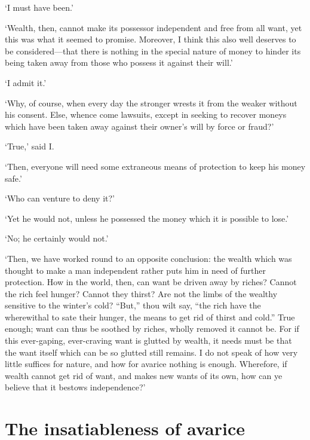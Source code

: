 \documentclass[11pt]{book}
\begin{document}
`I must have been.'

`Wealth, then, cannot make its possessor independent and free from all
want, yet this was what it seemed to promise. Moreover, I think this
also well deserves to be considered---that there is nothing in the
special nature of money to hinder its being taken away from those who
possess it against their will.'

`I admit it.'

`Why, of course, when every day the stronger wrests it from the weaker
without his consent. Else, whence come lawsuits, except in seeking to
recover moneys which have been taken away against their owner's will by
force or fraud?'

`True,' said I.

`Then, everyone will need some extraneous means of protection to keep
his money safe.'

`Who can venture to deny it?'

`Yet he would not, unless he possessed the money which it is possible to
lose.'

`No; he certainly would not.'

`Then, we have worked round to an opposite conclusion: the wealth which
was thought to make a man independent rather puts him in need of further
protection. How in the world, then, can want be driven away by riches?
Cannot the rich feel hunger? Cannot they thirst? Are not the limbs of
the wealthy sensitive to the winter's cold? ``But,'' thou wilt say, ``the
rich have the wherewithal to sate their hunger, the means to get rid of
thirst and cold.'' True enough; want can thus be soothed by riches,
wholly removed it cannot be. For if this ever-gaping, ever-craving want
is glutted by wealth, it needs must be that the want itself which can be
so glutted still remains. I do not speak of how very little suffices for
nature, and how for avarice nothing is enough. Wherefore, if wealth
cannot get rid of want, and makes new wants of its own, how can ye
believe that it bestows independence?'




\section{The insatiableness of avarice}
\end{document}
